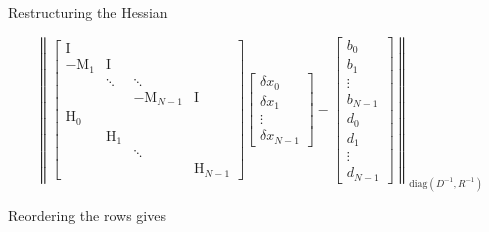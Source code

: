 \documentclass[9pt]{beamer}
\newcommand{\opl}[1]{\mathrm{{#1}}}
\renewcommand{\vec}[1]{\mathrm{\mathbf{#1}}}
\begin{document}



\begin{frame}[fragile]{Restructuring the Hessian}  

\begin{equation}
\left\| 
\begin{bmatrix} 
 \opl{I}   &         &                 &     \\
 -\opl{M}_1 & \opl{I} &                &     \\
            &  \ddots & \ddots         &      \\
            &         & -\opl{M}_{N-1} & \opl{I} \\ \hline
  \opl{H}_0 &         &                 &         \\              
            &  \opl{H}_1     &          &         \\
            &                & \ddots   &        \\ 
            &                &          & \opl{H}_{N-1}   
\end{bmatrix} 
\begin{bmatrix}
 \delta x_0 \\
 \delta x_1 \\ 
 \vdots  \\
 \delta x_{N-1} 
\end{bmatrix}
- 
\begin{bmatrix} 
b_0 \\
b_1 \\ 
\vdots \\
b_{N-1} \\ \hline
d_0 \\
d_1 \\
\vdots \\
d_{N-1}
\end{bmatrix} \right\|_{\mathrm{diag}(D^{-1},R^{-1})} 
\end{equation}

Reordering the rows gives 


\end{frame}
\end{document}
